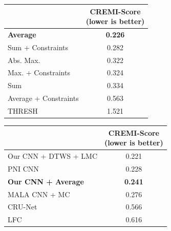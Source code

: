 \begin{figure}[t]
        \centering
\begin{minipage}[t]{0.56\textwidth}
    \centering
    \scriptsize
        \begin{tabular}[t]{l|c}
          & \makecell{CREMI-Score \\(lower is better)} \\ \midrule 
\textbf{\algname{}} \textbf{Average}& \textbf{0.226}  \\
\algname{} Sum + Constraints \cite{levinkov2017comparative} & 0.282 \\
\algname{} Abs. Max. \cite{wolf2018mutex} & 0.322 \\
\algname{} Max. + Constraints & 0.324 \\
\algname{} Sum \cite{keuper2015efficient} & 0.334 \\
\algname{} Average + Constraints & 0.563 \\
THRESH & 1.521 \\ 
        \end{tabular}
    \label{tab:results_cremi_train}
\end{minipage}\hfill
\begin{minipage}[t]{0.4\textwidth}
    \centering
    \scriptsize
        \begin{tabular}[t]{l|c}
         & \makecell{CREMI-Score \\(lower is better)}  \\ \midrule
Our CNN + DTWS + LMC &  0.221\\
PNI CNN \cite{lee2017superhuman} & 0.228 \\
\textbf{Our CNN + \algname{} Average} & \textbf{0.241} \\
MALA CNN + MC \cite{funke2018large} & 0.276 \\
CRU-Net \cite{zeng2017deepem3d} & 0.566  \\
LFC \cite{parag2017anisotropic} & 0.616  \\
        \end{tabular}
        \vspace*{1em}
    \label{tab:results_cremi_test}
\end{minipage}
\end{figure}

